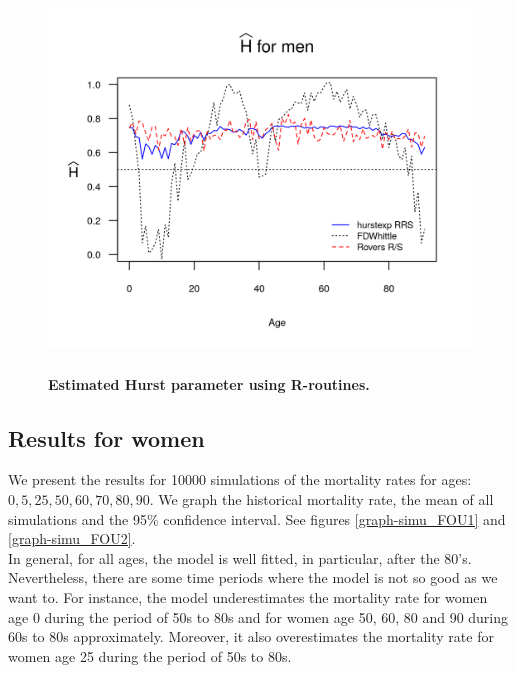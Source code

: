 \documentclass[smallextended]{svjour3}
\begin{document}
\begin{figure}[H]
    \includegraphics[width = 4.5in, height=4in]{Hurst-Men.png}
    \caption{\bf Estimated Hurst parameter using R-routines.}
    \label{graph-Hurst_Est_Me}
\end{figure}\vspace*{0.1cm}





\subsection{Results for women}\label{re-wom}

We present the results for 10000 simulations of the mortality rates for ages: 
$0,5,25,50,60,70,80,90$.
We graph the historical mortality rate, the mean of all simulations and the 
95\% confidence interval. See figures \ref{graph-simu_FOU1} and  
\ref{graph-simu_FOU2}.\\

In general, for all ages, the model is well fitted, in particular, after the 
80's. Nevertheless, there are some time periods where the model is not
so good as we want to. For instance, the model underestimates the mortality 
rate for women age 0 during the period of 50s to 80s and for women age 50, 60, 
80 and 90 during
60s to 80s approximately. Moreover, it also overestimates the mortality rate for
women age 25 during the period of 50s to 80s.
\end{document}
